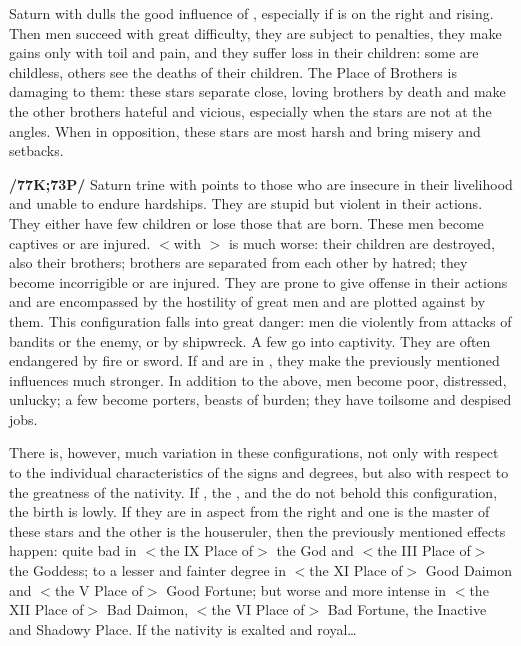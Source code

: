 Saturn \Square\xspace with \Jupiter\xspace dulls the good influence of \Jupiter, especially if \Saturn\xspace is on the right and rising. Then men succeed with great difficulty, they are subject to penalties, they make gains only with
toil and pain, and they suffer loss in their children: some are childless, others see the deaths of their children. The Place of Brothers is damaging to them: these stars separate close, loving brothers by death and make the other brothers hateful and vicious, especially when the stars are not at the angles. When in opposition, these stars are most harsh and bring misery and setbacks.

\textbf{/77K;73P/} Saturn \marginnote{\Saturn \Trine \Mars} trine with \Mars\xspace points to those who are insecure in their livelihood and unable to endure hardships. They are stupid but violent in their actions. They either have few children or lose those that are born. These men become captives or are injured. \Saturn\xspace \Square\xspace $<$with \Mars$>$ is much worse: their children are destroyed, also their brothers; brothers are separated from each other by hatred; they become incorrigible or are injured. They are prone to give offense in their actions and are encompassed by the hostility of great men and are plotted against by them. This configuration falls into great danger: men die violently from attacks of bandits or the enemy, or by shipwreck. A few go into captivity. They are often endangered by fire or sword. If \Saturn\xspace and \Mars\xspace are in \Opposition, they make the previously mentioned influences much stronger. In addition to the above, men become poor, distressed, unlucky; a few become porters, beasts of burden; they have toilsome and despised jobs. 

There \mndl is, however, much variation in these configurations, not only with respect to the individual characteristics of the signs and degrees, but also with respect to the greatness of the nativity. If \Jupiter, the
\Moon, and the \Sun\xspace do not behold this configuration, the birth is lowly. If they are in aspect from the right
and one is the master of these stars and the other is the houseruler, then the previously mentioned effects happen: quite bad in $<$the IX Place of$>$ the God and $<$the III Place of$>$ the Goddess; to a lesser and fainter degree in $<$the XI Place of$>$ Good Daimon and $<$the V Place of$>$ Good Fortune; but worse and more intense in $<$the XII Place of$>$ Bad Daimon, $<$the VI Place of$>$ Bad Fortune, the Inactive and Shadowy Place. If the nativity is exalted and royal\ldots

